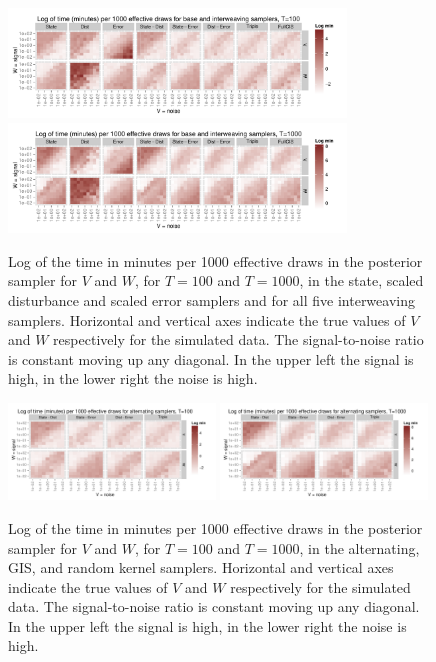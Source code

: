 \documentclass{article}
\begin{document}
\begin{figure}[!ht]
\centering
\includegraphics[width=0.8\textwidth]{baseinttimeplot1}
\includegraphics[width=0.8\textwidth]{baseinttimeplot2}
\caption{Log of the time in minutes per 1000 effective draws in the posterior sampler for $V$ and $W$, for $T=100$ and $T=1000$, in the state, scaled disturbance and scaled error samplers and for all five interweaving samplers. Horizontal and vertical axes indicate the true values of $V$ and $W$ respectively for the simulated data. The signal-to-noise ratio is constant moving up any diagonal. In the upper left the signal is high, in the lower right the noise is high.}
\label{baseinttimeplot}
\end{figure}


\begin{figure}[!ht]
\centering
\includegraphics[width=0.49\textwidth]{altinttimeplot1}
\includegraphics[width=0.49\textwidth]{altinttimeplot2}
\caption{Log of the time in minutes per 1000 effective draws in the posterior sampler for $V$ and $W$, for $T=100$ and $T=1000$, in the alternating, GIS, and random kernel samplers. Horizontal and vertical axes indicate the true values of $V$ and $W$ respectively for the simulated data. The signal-to-noise ratio is constant moving up any diagonal. In the upper left the signal is high, in the lower right the noise is high.}
\label{altinttimeplot}
\end{figure}
\end{document}
